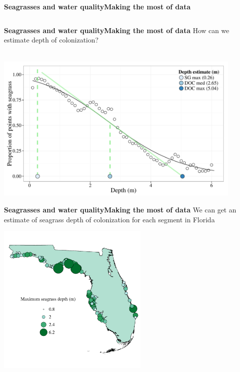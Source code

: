 \documentclass[serif]{beamer}\usepackage[]{graphicx}\usepackage[]{color}
\newenvironment{knitrout}{}{} %
\begin{document}
\begin{frame}{\textbf{Seagrasses and water quality}}{\textbf{Making the most of data}}
\begin{columns}[T]
\begin{column}{0.32\textwidth}
\begin{knitrout}
{}



\end{knitrout}
\end{column}
\end{columns}
\end{frame}

\begin{frame}{\textbf{Seagrasses and water quality}}{\textbf{Making the most of data}}
\onslide<+->
How can we estimate depth of colonization? \\~\\


{\centering \includegraphics[width=0.9\textwidth]{fig//sg_est_ex} 

}



\end{frame}



\begin{frame}{\textbf{Seagrasses and water quality}}{\textbf{Making the most of data}}
We can get an estimate of seagrass depth of colonization for each segment in Florida \scriptsize \cite{HagyIR}
\vspace{-0.25in}
\centerline{\includegraphics[width = 0.55\textwidth]{fig/sgdepthall.pdf}}
\end{frame}
\end{document}
